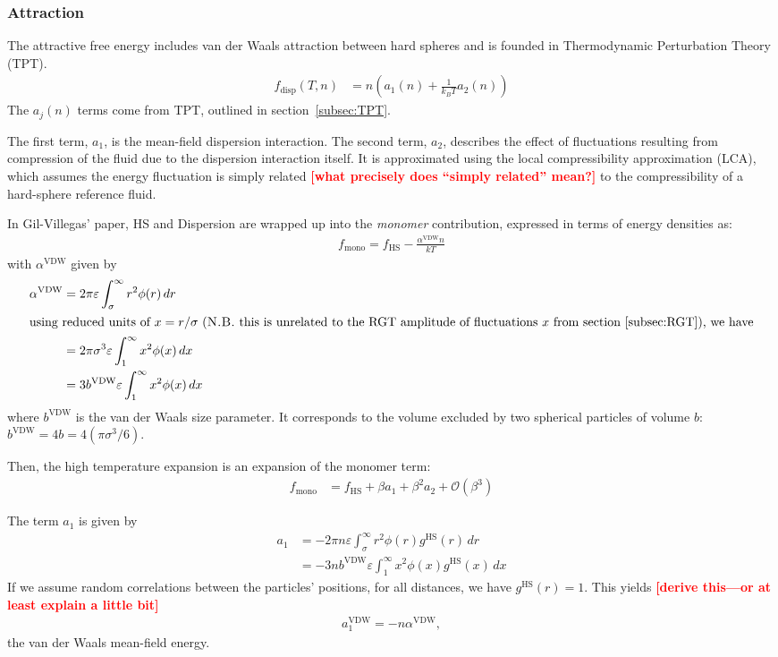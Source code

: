 \documentclass[letterpaper,twocolumn,amsmath,amssymb,prb]{revtex4-1}
\newcommand{\kT}{\ensuremath{k_BT}}
\newcommand{\fdisp}{\ensuremath{f_\text{disp}(T,n)}}
\newcommand{\1}{\ensuremath{\textbf{r}_1}}
\newcommand{\2}{\ensuremath{\textbf{r}_2}}
\newcommand{\3}{\ensuremath{\textbf{r}_3}}
\newcommand{\4}{\ensuremath{\textbf{r}_4}}
\newcommand{\fixme}[1]{\textcolor{red}{\textbf{[#1]}}}
\begin{document}
\subsubsection{Attraction}\label{sub2sec:disp}
The attractive free energy includes van der Waals attraction between
hard spheres and is founded in Thermodynamic Perturbation Theory
(TPT).
\begin{align}
  \fdisp &= n \left( a_1(n) + \frac{1}{\kT}a_2(n) \right)
\end{align}
The $a_j(n)$ terms come from TPT, outlined in section~\ref{subsec:TPT}.

The first term, $a_1$, is the mean-field dispersion interaction. The
second term, $a_2$, describes the effect of fluctuations resulting
from compression of the fluid due to the dispersion interaction
itself. It is approximated using the local compressibility
approximation (LCA), which assumes the energy fluctuation is simply
related \fixme{what precisely does ``simply related'' mean?} to the compressibility of a hard-sphere reference
fluid.\cite{Barker76}

In Gil-Villegas' paper,\cite{gil-villegas97} HS and Dispersion are wrapped up into the
\textit{monomer} contribution, expressed in terms of energy densities
as:
\begin{align}
  f_\text{mono} = f_\text{HS} - \frac{\alpha^\text{VDW}n}{kT}
\end{align}
with $\alpha^\text{VDW}$ given by
\begin{align}
  \alpha^\text{VDW} &= 2\pi\varepsilon\int_\sigma^\infty r^2\phi(r)\,dr \\
  \intertext{using reduced units of $x = r/\sigma$ (\textsc{N.B.}~this is unrelated to the RGT amplitude of fluctuations $x$ from section~\ref{subsec:RGT}), we have}
  &= 2\pi\sigma^3\varepsilon\int_1^\infty x^2\phi(x)\,dx \nonumber \\
  &= 3b^\text{VDW}\varepsilon\int_1^\infty x^2\phi(x)\,dx
\end{align}
where $b^\text{VDW}$ is the van der Waals size parameter. It
corresponds to the volume excluded by two spherical particles of
volume $b$: $b^\text{VDW} = 4b = 4\left(\pi\sigma^3/6\right)$.

Then, the high temperature expansion is an expansion of the monomer term:
\begin{align}
  f_\text{mono} &= f_\text{HS} + \beta a_1 + \beta^2 a_2 + \mathcal{O}(\beta^3)
\end{align}

The term $a_1$ is given by
\begin{align}
  a_1 &= -2\pi n \varepsilon\int_\sigma^\infty r^2\phi(r)g^\text{HS}(r)\,dr \\
  &= -3 n  b^\text{VDW}\varepsilon\int_1^\infty x^2\phi(x)g^\text{HS}(x)\,dx
\end{align}
If we assume random correlations between the particles' positions, for
all distances, we have $g^\text{HS}(r) = 1$. This yields \fixme{derive this---or at least explain a little bit}
\begin{align}
  a_1^\text{VDW} = - n \alpha^\text{VDW},
\end{align}
the van der Waals mean-field energy.
\end{document}
